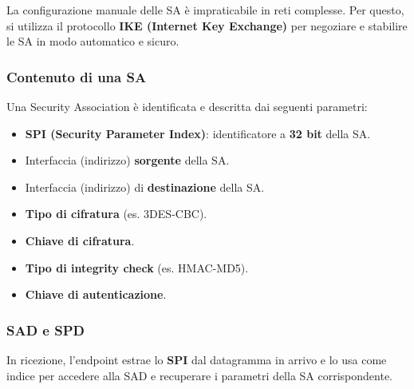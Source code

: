 La configurazione manuale delle SA è impraticabile in reti complesse. Per questo, si utilizza il protocollo \textbf{IKE (Internet Key Exchange)} per negoziare e stabilire le SA in modo automatico e sicuro.

\subsubsection{Contenuto di una SA}
Una Security Association è identificata e descritta dai seguenti parametri:
\begin{itemize}
    \item \textbf{SPI (Security Parameter Index)}: identificatore a \textbf{32 bit} della SA.
    \item Interfaccia (indirizzo) \textbf{sorgente} della SA.
    \item Interfaccia (indirizzo) di \textbf{destinazione} della SA.
    \item \textbf{Tipo di cifratura} (es. 3DES-CBC).
    \item \textbf{Chiave di cifratura}.
    \item \textbf{Tipo di integrity check} (es. HMAC-MD5).
    \item \textbf{Chiave di autenticazione}.
\end{itemize}

\subsubsection{SAD e SPD}
In ricezione, l'endpoint estrae lo \textbf{SPI} dal datagramma in arrivo e lo usa come indice per accedere alla SAD e recuperare i parametri della SA corrispondente.



